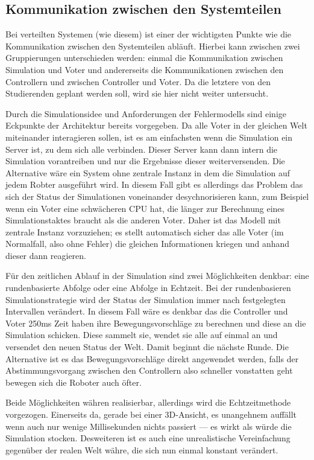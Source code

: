 \subsection{Kommunikation zwischen den Systemteilen}
Bei verteilten Systemen (wie diesem) ist einer der wichtigsten Punkte wie die Kommunikation zwischen den Systemteilen abl{\"{a}}uft.
Hierbei kann zwischen zwei Gruppierungen unterschieden werden: einmal die Kommunikation zwischen Simulation und Voter und andererseits
die Kommunikationen zwischen den Controllern und zwischen Controller und Voter. Da die letztere von den Studierenden geplant werden soll,
wird sie hier nicht weiter untersucht.

Durch die Simulationsidee und Anforderungen der Fehlermodells sind einige Eckpunkte der Architektur bereits vorgegeben. Da alle Voter
in der gleichen Welt miteinander interagieren sollen, ist es am einfachsten wenn die Simulation ein Server ist, zu dem sich alle
verbinden. Dieser Server kann dann intern die Simulation vorantreiben und nur die Ergebnisse dieser weiterversenden. Die Alternative
w{\"{a}}re ein System ohne zentrale Instanz in dem die Simulation auf jedem Robter ausgef{\"{u}}hrt wird. In diesem Fall gibt es
allerdings das Problem das sich der Status der Simulationen voneinander desychnorisieren kann, zum Beispiel wenn ein Voter
eine schw{\"{a}}cheren CPU hat, die l{\"{a}}nger zur Berechnung eines Simulationstaktes braucht als die anderen Voter. Daher ist
das Modell mit zentrale Instanz vorzuziehen; es stellt automatisch sicher das alle Voter (im Normalfall, also ohne Fehler)
die gleichen Informationen kriegen und anhand dieser dann reagieren.

F{\"{u}}r den zeitlichen Ablauf in der Simulation sind zwei M{\"{o}}glichkeiten denkbar: eine rundenbasierte Abfolge oder eine
Abfolge in Echtzeit. Bei der rundenbasieren Simulationstrategie wird der Status der Simulation immer nach festgelegten Intervallen
ver{\"{a}}ndert. In diesem Fall w{\"{a}}re es denkbar das die Controller und Voter 250ms Zeit haben ihre Bewegungsvorschl{\"{a}}ge
zu berechnen und diese an die Simulation schicken. Diese sammelt sie, wendet sie alle auf einmal an und versendet den neuen Status der
Welt. Damit beginnt die n{\"{a}}chste Runde. Die Alternative ist es das Bewegungsvorschl{\"{a}}ge direkt angewendet werden, falls
der Abstimmungsvorgang zwischen den Controllern also schneller vonstatten geht bewegen sich die Roboter auch {\"{o}}fter.

Beide M{\"{o}}glichkeiten w{\"{a}}hren realisierbar, allerdings wird die Echtzeitmethode vorgezogen. Einerseits da, gerade bei einer
3D-Ansicht, es unangehnem auff{\"{a}}llt wenn auch nur wenige Millisekunden nichts passiert --- es wirkt als w{\"{u}}rde die
Simulation stocken. Desweiteren ist es auch eine unrealistische Vereinfachung gegen{\"{u}}ber der realen Welt w{\"{a}}hre,
die sich nun einmal konstant ver{\"{a}}ndert.

